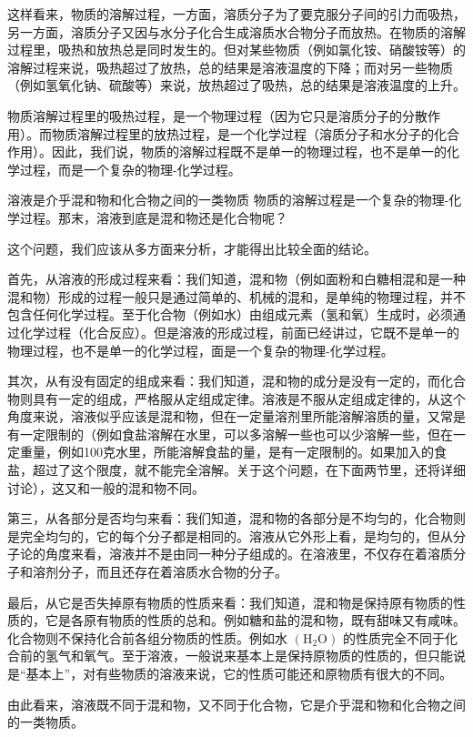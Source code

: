 这样看来，物质的溶解过程，一方面，溶质分子为了要克服分子间的引力而吸热，另一方面，溶质分子又因与水分子化合生成溶质水合物分子而放热。在物质的溶解过程里，吸热和放热总是同时发生的。但对某些物质（例如氯化铵、硝酸铵等）的溶解过程来说，吸热超过了放热，总的结果是溶液温度的下降；而对另一些物质（例如氢氧化钠、硫酸等）来说，放热超过了吸热，总的结果是溶液温度的上升。

物质溶解过程里的吸热过程，是一个物理过程（因为它只是溶质分子的分散作用）。而物质溶解过程里的放热过程，是一个化学过程（溶质分子和水分子的化合作用）。因此，我们说，物质的溶解过程既不是单一的物理过程，也不是单一的化学过程，而是一个复杂的物理-化学过程。

溶液是介乎混和物和化合物之间的一类物质
物质的溶解过程是一个复杂的物理-化学过程。那末，溶液到底是混和物还是化合物呢？

这个问题，我们应该从多方面来分析，才能得出比较全面的结论。

首先，从溶液的形成过程来看：我们知道，混和物（例如面粉和白糖相混和是一种混和物）形成的过程一般只是通过简单的、机械的混和，是单纯的物理过程，并不包含任何化学过程。至于化合物（例如水）由组成元素（氢和氧）生成时，必须通过化学过程（化合反应）。但是溶液的形成过程，前面已经讲过，它既不是单一的物理过程，也不是单一的化学过程，面是一个复杂的物理-化学过程。

其次，从有没有固定的组成来看：我们知道，混和物的成分是没有一定的，而化合物则具有一定的组成，严格服从定组成定律。溶液是不服从定组成定律的，从这个角度来说，溶液似乎应该是混和物，但在一定量溶剂里所能溶解溶质的量，又常是有一定限制的（例如食盐溶解在水里，可以多溶解一些也可以少溶解一些，但在一定重量，例如100克水里，所能溶解食盐的量，是有一定限制的。如果加入的食盐，超过了这个限度，就不能完全溶解。关于这个问题，在下面两节里，还将详细讨论），这又和一般的混和物不同。

第三，从各部分是否均匀来看：我们知道，混和物的各部分是不均匀的，化合物则是完全均匀的，它的每个分子都是相同的。溶液从它外形上看，是均匀的，但从分子论的角度来看，溶液并不是由同一种分子组成的。在溶液里，不仅存在着溶质分子和溶剂分子，而且还存在着溶质水合物的分子。

最后，从它是否失掉原有物质的性质来看：我们知道，混和物是保持原有物质的性质的，它是各原有物质的性质的总和。例如糖和盐的混和物，既有甜味又有咸味。化合物则不保持化合前各组分物质的性质。例如水
\(\left(\mathrm{H}_{2}\mathrm{O}\right)\)
的性质完全不同于化合前的氢气和氧气。至于溶液，一般说来基本上是保持原物质的性质的，但只能说是``基本上''，对有些物质的溶液来说，它的性质可能还和原物质有很大的不同。

由此看来，溶液既不同于混和物，又不同于化合物，它是介乎混和物和化合物之间的一类物质。

